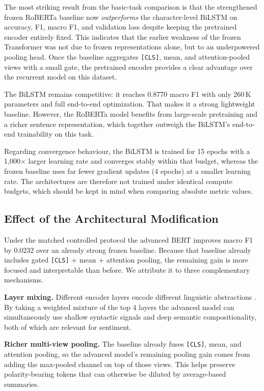 \documentclass{article}
\begin{document}
The most striking result from the basic-task comparison is that the strengthened
frozen RoBERTa baseline now \emph{outperforms} the character-level BiLSTM on
accuracy, F1, macro F1, and validation loss despite keeping the pretrained
encoder entirely fixed.  This indicates that the earlier weakness of the frozen
Transformer was not due to frozen representations alone, but to an
underpowered pooling head.  Once the baseline aggregates \texttt{[CLS]}, mean,
and attention-pooled views with a small gate, the pretrained encoder provides a
clear advantage over the recurrent model on this dataset.

The BiLSTM remains competitive: it reaches 0.8770 macro F1 with only
260\,K parameters and full end-to-end optimization.  That makes it a strong
lightweight baseline.  However, the RoBERTa model benefits from large-scale
pretraining and a richer sentence representation, which together outweigh the
BiLSTM's end-to-end trainability on this task.

Regarding convergence behaviour, the BiLSTM is trained for 15 epochs with a
1{,}000$\times$ larger learning rate and converges stably within that budget,
whereas the frozen baseline uses far fewer gradient updates (4 epochs) at
a smaller learning rate.  The architectures are therefore not trained under
identical compute budgets, which should be kept in mind when comparing absolute
metric values.

\subsection{Effect of the Architectural Modification}

Under the matched controlled protocol the advanced BERT improves macro F1 by
0.0232 over an already strong frozen baseline.  Because that baseline already
includes gated \texttt{[CLS]} + mean + attention pooling, the remaining gain is
more focused and interpretable than before.  We attribute it to three
complementary mechanisms.

\textbf{Layer mixing.}  Different encoder layers encode different linguistic
abstractions \citep{tenney2019bert}.  By taking a weighted mixture of the top 4
layers the advanced model can simultaneously use shallow syntactic signals and
deep semantic compositionality, both of which are relevant for sentiment.

\textbf{Richer multi-view pooling.}  The baseline already fuses
\texttt{[CLS]}, mean, and attention pooling, so the advanced model's remaining
pooling gain comes from adding the max-pooled channel on top of those views.
This helps preserve polarity-bearing tokens that can otherwise be diluted by
average-based summaries.
\end{document}
